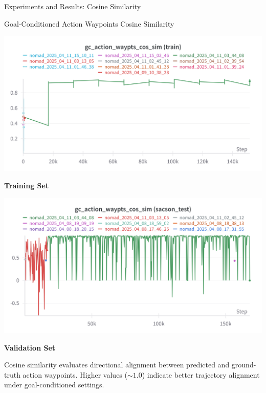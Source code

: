 \documentclass{beamer}
\begin{document}
\begin{frame}{Experiments and Results: Cosine Similarity}
    \begin{block}{Goal-Conditioned Action Waypoints Cosine Similarity}
        \begin{minipage}{0.48\textwidth}
            \centering
            \includegraphics[width=\textwidth]{images/gc_action_sim_nomad.png}

        
            \textbf{Training Set}
        \end{minipage}
        \hfill
        \begin{minipage}{0.48\textwidth}
            \centering
            \includegraphics[width=\textwidth]{images/gc_action_cos_sim_test.png}

            \textbf{Validation Set}
        \end{minipage}
        
        \vspace{0.5em}
        \bigskip
        Cosine similarity evaluates directional alignment between predicted and ground-truth action waypoints. 
        Higher values ($\sim1.0$) indicate better trajectory alignment under goal-conditioned settings.
    \end{block}
\end{frame}
\end{document}
